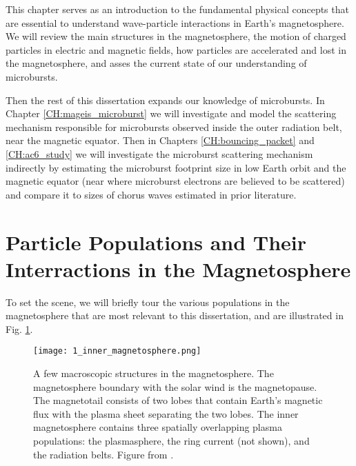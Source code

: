 This chapter serves as an introduction to the fundamental physical concepts that are essential to understand wave-particle interactions in Earth's magnetosphere. We will review the main structures in the magnetosphere, the motion of charged particles in electric and magnetic fields, how particles are accelerated and lost in the magnetosphere, and asses the current state of our understanding of microbursts.

Then the rest of this dissertation expands our knowledge of microbursts. In Chapter \ref{CH:mageis_microburst} we will investigate and model the scattering mechanism responsible for microbursts observed inside the outer radiation belt, near the magnetic equator. Then in Chapters \ref{CH:bouncing_packet} and \ref{CH:ac6_study} we will investigate the microburst scattering mechanism indirectly by estimating the microburst footprint size in low Earth orbit and the magnetic equator (near where microburst electrons are believed to be scattered) and compare it to sizes of chorus waves estimated in prior literature.

\section{Particle Populations and Their Interractions in the Magnetosphere}\label{ntro:particle_populations}
To set the scene, we will briefly tour the various populations in the magnetosphere that are most relevant to this dissertation, and are illustrated in Fig. \ref{Intro:inner_magnetosphere}.

\begin{figure}
\texttt{[image: 1\_inner\_magnetosphere.png]}
\caption{A few macroscopic structures in the magnetosphere. The magnetosphere boundary with the solar wind is the magnetopause. The magnetotail consists of two lobes that contain Earth's magnetic flux with the plasma sheet separating the two lobes. The inner magnetosphere contains three spatially overlapping plasma populations: the plasmasphere, the ring current (not shown), and the radiation belts. Figure from \citet{Baumjohann1997}.}
\label{Intro:inner_magnetosphere}
\end{figure}

